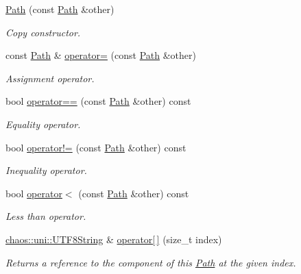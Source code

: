 \begin{DoxyCompactItemize}
\hyperlink{classchaos_1_1io_1_1sys_1_1_path_a40b3bf651b667adbd3eeb1ee55564211}{Path} (const \hyperlink{classchaos_1_1io_1_1sys_1_1_path}{Path} \&other)
\begin{DoxyCompactList}\small\item\em Copy constructor. \end{DoxyCompactList}\item 
const \hyperlink{classchaos_1_1io_1_1sys_1_1_path}{Path} \& \hyperlink{classchaos_1_1io_1_1sys_1_1_path_a45c70fc34ff619e890d5bc807dd70d8b}{operator=} (const \hyperlink{classchaos_1_1io_1_1sys_1_1_path}{Path} \&other)
\begin{DoxyCompactList}\small\item\em Assignment operator. \end{DoxyCompactList}\item 
bool \hyperlink{classchaos_1_1io_1_1sys_1_1_path_ac2e63307a0526625f4447f1d2a704e3b}{operator==} (const \hyperlink{classchaos_1_1io_1_1sys_1_1_path}{Path} \&other) const 
\begin{DoxyCompactList}\small\item\em Equality operator. \end{DoxyCompactList}\item 
bool \hyperlink{classchaos_1_1io_1_1sys_1_1_path_acd6dea0a797c0307179a5523239a299a}{operator!=} (const \hyperlink{classchaos_1_1io_1_1sys_1_1_path}{Path} \&other) const 
\begin{DoxyCompactList}\small\item\em Inequality operator. \end{DoxyCompactList}\item 
bool \hyperlink{classchaos_1_1io_1_1sys_1_1_path_a90858bbce348d5b36d0c31d771c601d8}{operator$<$} (const \hyperlink{classchaos_1_1io_1_1sys_1_1_path}{Path} \&other) const 
\begin{DoxyCompactList}\small\item\em Less than operator. \end{DoxyCompactList}\item 
\hyperlink{classchaos_1_1uni_1_1_u_t_f8_string}{chaos\-::uni\-::\-U\-T\-F8\-String} \& \hyperlink{classchaos_1_1io_1_1sys_1_1_path_ae7503e76ec85786225fc25b572deaeea}{operator\mbox{[}$\,$\mbox{]}} (size\-\_\-t index)
\begin{DoxyCompactList}\small\item\em Returns a reference to the component of this \hyperlink{classchaos_1_1io_1_1sys_1_1_path}{Path} at the given index. \end{DoxyCompactList}\item 

\end{DoxyCompactItemize}

